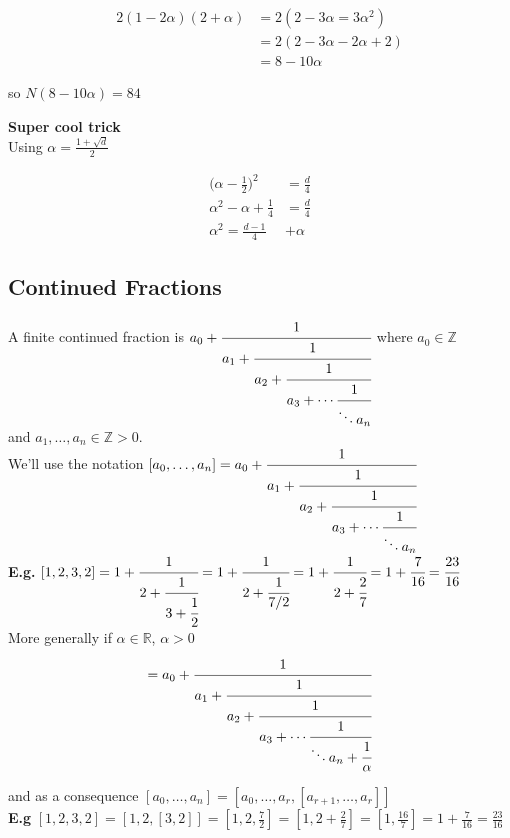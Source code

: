 \documentclass[11pt]{article}
\begin{document}
\begin{align*}
	2(1-2\alpha)(2+\alpha) &= 2(2-3\alpha=3\alpha^2)\\
	&=2(2-3\alpha-2\alpha+2)\\
	&=8-10\alpha
\end{align*}

so $N(8-10\alpha) = 84$


$ $\\[1em]
\textbf{Super cool trick}\\[1em]
Using $\alpha = \frac{1+\sqrt{d}}{2}$

\begin{align*}
	\Big(\alpha - \frac{1}{2} \Big)^2 &= \frac{d}{4}\\[0.5em]
	\alpha^2 - \alpha + \frac{1}{4} &= \frac{d}{4}\\[1em]
	\alpha^2 = \frac{d-1}{4} &+ \alpha
\end{align*}

\subsection{Continued Fractions}

A finite continued fraction is $a_0+\cfrac{1}{a_1+\cfrac{1}{a_2+\cfrac{1}{a_3+ \cdots \cfrac{1}{\ddots a_n}} }}$
where $a_0 \in \mathbb{Z}$ \\and $a_1, \dots, a_n \in \mathbb{Z} >0$.\\[1em]

We'll use the notation $[a_0, \dots, a_n] = a_0+\cfrac{1}{a_1+\cfrac{1}{a_2+\cfrac{1}{a_3+ \cdots \cfrac{1}{\ddots a_n}} }}$\\[1em]
$ $\\
\textbf{E.g.} $[1,2,3,2] = 1 + \cfrac{1}{2 + \cfrac{1}{3+ \cfrac{1}{2}}} = 1+\cfrac{1}{2+\cfrac{1}{7/2}} = 1 + \cfrac{1}{2 + \cfrac{2}{7}} = 1 + \cfrac{7}{16} = \cfrac{23}{16}$ 
\\[1em]
$ $ \\
More generally if $\alpha \in \mathbb{R}$, $ \alpha > 0 $
\begin{align*}
	[a_0, \dots, a_n, \alpha] = a_0+\cfrac{1}{a_1+\cfrac{1}{a_2+\cfrac{1}{a_3+ \cdots \cfrac{1}{\ddots a_n + \cfrac{1}{\alpha}}} }}
\end{align*}

and as a consequence $[a_0, \dots, a_n] = [a_0,\dots, a_r, [a_{r+1},\dots, a_r]]$\\[1em]
$ $\\
\textbf{E.g} $[1,2,3,2]= [1,2,[3,2]] = [1,2,\frac{7}{2}] = [1, 2 + \frac{2}{7}] = [1, \frac{16}{7} ] = 1+ \frac{7}{16} = \frac{23}{16} $\\[1em]
\end{document}
